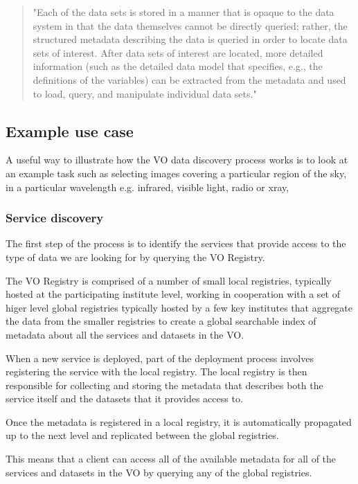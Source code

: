 \documentclass{article}
\begin{document}
\begin{quote}
"Each of the data sets is stored in a manner that is opaque to the data system in
that the data themselves cannot be directly queried; rather, the structured
metadata describing the data is queried in order to locate data sets of
interest. After data sets of interest are located, more detailed information
(such as the detailed data model that specifies, e.g., the definitions of the
variables) can be extracted from the metadata and used to load, query, and
manipulate individual data sets."
\end{quote}

\subsection{Example use case}

A useful way to illustrate how the VO data discovery process works is to look at
an example task such as selecting images covering a particular region of the
sky, in a particular wavelength e.g. infrared, visible light, radio or xray,

\subsubsection{Service discovery}

The first step of the process is to identify the services that provide access to
the type of data we are looking for by querying the VO Registry.

The VO Registry is comprised of a number of small local registries, typically
hosted at the participating institute level, working in cooperation with a set
of higer level global registries typically hosted by a few key institutes that
aggregate the data from the smaller registries to create a global searchable
index of metadata about all the services and datasets in the VO.

When a new service is deployed, part of the deployment process involves
registering the service with the local registry. The local registry is then
responsible for collecting and storing the metadata that describes both the
service itself and the datasets that it provides access to.

Once the metadata is registered in a local registry, it is automatically
propagated up to the next level and replicated between the global registries.

This means that a client can access all of the available metadata for all of the
services and datasets in the VO by querying any of the global registries.
\end{document}
